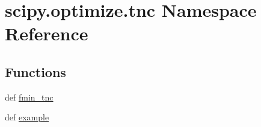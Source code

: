 \hypertarget{namespacescipy_1_1optimize_1_1tnc}{}\section{scipy.\+optimize.\+tnc Namespace Reference}
\label{namespacescipy_1_1optimize_1_1tnc}
\subsection*{Functions}
\begin{DoxyCompactItemize}
\item 
def \hyperlink{namespacescipy_1_1optimize_1_1tnc_a7f2939e18b1a7cbba18fb501a3dda100}{fmin\+\_\+tnc}
\item 
def \hyperlink{namespacescipy_1_1optimize_1_1tnc_a95c8fc77f74a4d2f7bb2058a4f0620f6}{example}
\end{DoxyCompactItemize}
